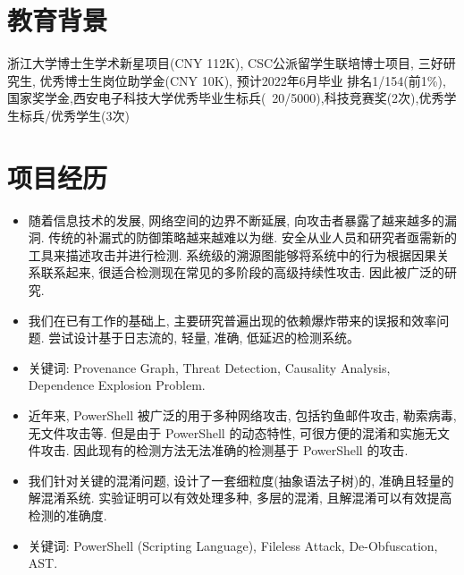 \documentclass{resume}
\begin{document}






\section{教育背景}
浙江大学博士生学术新星项目(CNY 112K), CSC公派留学生联培博士项目, 三好研究生, 优秀博士生岗位助学金(CNY 10K), 预计2022年6月毕业
排名1/154(前1\%),国家奖学金,西安电子科技大学优秀毕业生标兵(~20/5000),科技竞赛奖(2次),优秀学生标兵/优秀学生(3次)


\section{项目经历}
\begin{itemize}
  \item 随着信息技术的发展, 网络空间的边界不断延展, 向攻击者暴露了越来越多的漏洞. 传统的补漏式的防御策略越来越难以为继. 安全从业人员和研究者亟需新的工具来描述攻击并进行检测. 系统级的溯源图能够将系统中的行为根据因果关系联系起来, 很适合检测现在常见的多阶段的高级持续性攻击. 因此被广泛的研究. 
  \item 我们在已有工作的基础上, 主要研究普遍出现的依赖爆炸带来的误报和效率问题. 尝试设计基于日志流的, 轻量, 准确, 低延迟的检测系统。 
  \item 关键词: Provenance Graph, Threat Detection, Causality Analysis, Dependence Explosion Problem.
\end{itemize}

\begin{itemize}
  \item 近年来, PowerShell 被广泛的用于多种网络攻击, 包括钓鱼邮件攻击, 勒索病毒, 无文件攻击等. 但是由于 PowerShell 的动态特性, 可很方便的混淆和实施无文件攻击. 因此现有的检测方法无法准确的检测基于 PowerShell 的攻击. 
  \item 我们针对关键的混淆问题, 设计了一套细粒度(抽象语法子树)的, 准确且轻量的解混淆系统. 实验证明可以有效处理多种, 多层的混淆, 且解混淆可以有效提高检测的准确度. 
  \item 关键词: PowerShell (Scripting Language), Fileless Attack, De-Obfuscation, AST.
\end{itemize}
\end{document}
